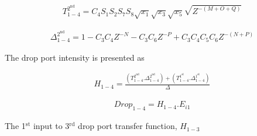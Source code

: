 \documentclass{osa-article}
\begin{document}
\begin{equation}
\begin{split}
T^{2^{\text{nd}}}_{1-4}=C_4S_1S_2S_7S_8\sqrt{x_1}\sqrt{x_3}\sqrt{x_5}\sqrt{Z^{-(M+O+Q)}}
\end{split}
\end{equation}

\begin{equation}
\begin{split}
\Delta^{2^{\text{nd}}}_{1-4}=1-C_3C_4Z^{-N}-C_3C_6Z^{-P}+C_3C_4C_5C_6Z^{-(N+P)}
\end{split}
\end{equation}

The drop port intensity is presented as

\begin{equation}
\begin{split}
H_{1-4}=\frac{(T^{2^{\text{nd}}}_{1-4}.\Delta^{2^{\text{nd}}}_{1-4})+(T^{1^{\text{st}}}_{1-4}.\Delta^{1^{\text{st}}}_{1-4})}{\Delta}
\end{split}
\end{equation}

\begin{equation}
\begin{split}
Drop_{1-4}=H_{1-4}.E_{i1}
\end{split}
\end{equation}

The 1$^{\text{st}}$ input to 3$^{\text{rd}}$ drop port transfer function, $H_{1-3}$\\
\end{document}
